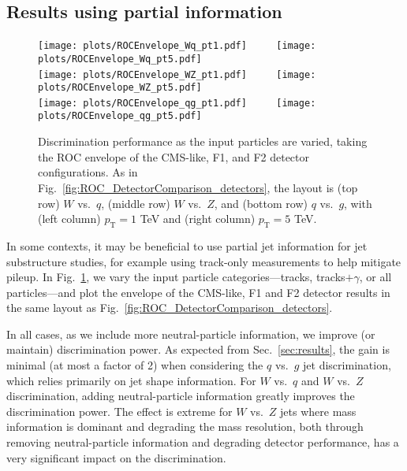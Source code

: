 \documentclass[11pt,letterpaper]{article}
\DeclareRobustCommand{\Sec}[1]{Sec.~\ref{#1}}
\DeclareRobustCommand{\Fig}[1]{Fig.~\ref{#1}}
\newcommand{\pt}{p_{\mathrm{T}}}
\begin{document}
\subsection{Results using partial information}
\label{sec:DetecCompResults}


\begin{figure}[p]
\begin{center}
\texttt{[image: plots/ROCEnvelope\_Wq\_pt1.pdf]}
$\qquad$
\texttt{[image: plots/ROCEnvelope\_Wq\_pt5.pdf]} \\
\texttt{[image: plots/ROCEnvelope\_WZ\_pt1.pdf]}
$\qquad$
\texttt{[image: plots/ROCEnvelope\_WZ\_pt5.pdf]} \\
\texttt{[image: plots/ROCEnvelope\_qg\_pt1.pdf]}
$\qquad$
\texttt{[image: plots/ROCEnvelope\_qg\_pt5.pdf]}
\end{center}
\caption{Discrimination performance as the input particles are varied, taking the ROC envelope of the CMS-like, F1, and F2 detector configurations.  As in \Fig{fig:ROC_DetectorComparison_detectors}, the layout is (top row) $W$ vs.~$q$, (middle row) $W$ vs.~$Z$, and (bottom row) $q$ vs.~$g$, with (left column) $\pt=1$ TeV and (right column) $\pt=5$ TeV.}
\label{fig:ROC_DetectorComparison_inputs}
\end{figure}



In some contexts, it may be beneficial to use partial jet information for jet substructure studies, for example using track-only measurements to help mitigate pileup.
%
In \Fig{fig:ROC_DetectorComparison_inputs}, we vary the input particle categories---tracks, tracks$+\gamma$, or all particles---and plot the envelope of the CMS-like, F1 and F2 detector results in the same layout as \Fig{fig:ROC_DetectorComparison_detectors}.

In all cases, as we include more neutral-particle information, we improve (or maintain) discrimination power.
%
As expected from \Sec{sec:results}, the gain is minimal (at most a factor of 2) when considering the $q$ vs.~$g$ jet discrimination, which relies primarily on jet shape information.
%
For $W$ vs.~$q$ and $W$ vs.~$Z$ discrimination, adding neutral-particle information greatly improves the discrimination power.
%
The effect is extreme for $W$ vs.~$Z$ jets where mass information is dominant and degrading the mass resolution, both through removing neutral-particle information and degrading detector performance, has a very significant impact on the discrimination. 
\end{document}

